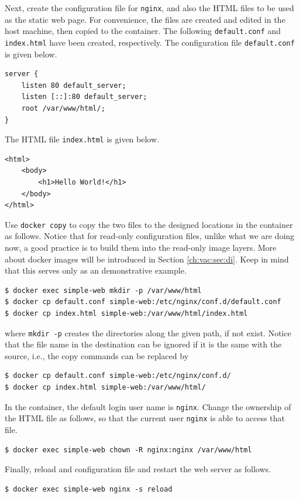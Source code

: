 Next, create the configuration file for \verb|nginx|, and also the HTML files to be used as the static web page. For convenience, the files are created and edited in the host machine, then copied to the container. The following \verb|default.conf| and \verb|index.html| have been created, respectively. The configuration file \verb|default.conf| is given below.
\begin{lstlisting}
server {
	listen 80 default_server;
	listen [::]:80 default_server;
	root /var/www/html/;
}
\end{lstlisting}
The HTML file \verb|index.html| is given below.
\begin{lstlisting}
<html>
	<body>
		<h1>Hello World!</h1>
	</body>
</html>
\end{lstlisting}
Use \verb|docker copy| to copy the two files to the designed locations in the container as follows. Notice that for read-only configuration files, unlike what we are doing now, a good practice is to build them into the read-only image layers. More about docker images will be introduced in Section \ref{ch:vac:sec:di}. Keep in mind that this serves only as an demonstrative example.
\begin{lstlisting}
$ docker exec simple-web mkdir -p /var/www/html
$ docker cp default.conf simple-web:/etc/nginx/conf.d/default.conf
$ docker cp index.html simple-web:/var/www/html/index.html
\end{lstlisting}
where \verb|mkdir -p| creates the directories along the given path, if not exist. Notice that the file name in the destination can be ignored if it is the same with the source, i.e., the copy commands can be replaced by
\begin{lstlisting}
$ docker cp default.conf simple-web:/etc/nginx/conf.d/
$ docker cp index.html simple-web:/var/www/html/
\end{lstlisting}

In the container, the default login user name is \verb|nginx|. Change the ownership of the HTML file as follows, so that the current user \verb|nginx| is able to access that file.
\begin{lstlisting}
$ docker exec simple-web chown -R nginx:nginx /var/www/html
\end{lstlisting}

Finally, reload and configuration file and restart the web server as follows.
\begin{lstlisting}
$ docker exec simple-web nginx -s reload
\end{lstlisting}

